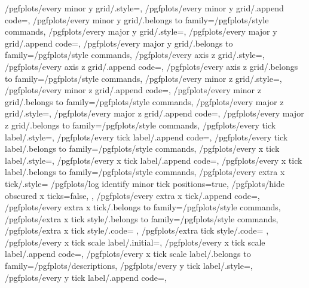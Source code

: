 {	/pgfplots/every minor y grid/.style={},
	/pgfplots/every minor y grid/.append code={},
	/pgfplots/every minor y grid/.belongs to family=/pgfplots/style commands,
	/pgfplots/every major y grid/.style={},
	/pgfplots/every major y grid/.append code={},
	/pgfplots/every major y grid/.belongs to family=/pgfplots/style commands,
	/pgfplots/every axis z grid/.style={},
	/pgfplots/every axis z grid/.append code={},
	/pgfplots/every axis z grid/.belongs to family=/pgfplots/style commands,
	/pgfplots/every minor z grid/.style={},
	/pgfplots/every minor z grid/.append code={},
	/pgfplots/every minor z grid/.belongs to family=/pgfplots/style commands,
	/pgfplots/every major z grid/.style={},
	/pgfplots/every major z grid/.append code={},
	/pgfplots/every major z grid/.belongs to family=/pgfplots/style commands,
	/pgfplots/every tick label/.style={},
	/pgfplots/every tick label/.append code={},
	/pgfplots/every tick label/.belongs to family=/pgfplots/style commands,
	/pgfplots/every x tick label/.style={},
	/pgfplots/every x tick label/.append code={},
	/pgfplots/every x tick label/.belongs to family=/pgfplots/style commands,
	/pgfplots/every extra x tick/.style={
		/pgfplots/log identify minor tick positions=true,
		/pgfplots/hide obscured x ticks=false,
	},
	/pgfplots/every extra x tick/.append code={},
	/pgfplots/every extra x tick/.belongs to family=/pgfplots/style commands,
	/pgfplots/extra x tick style/.belongs to family=/pgfplots/style commands,
	/pgfplots/extra x tick style/.code={%
	},
	/pgfplots/extra tick style/.code={%
	},
	/pgfplots/every x tick scale label/.initial=,%
	/pgfplots/every x tick scale label/.append code={},
	/pgfplots/every x tick scale label/.belongs to family=/pgfplots/descriptions,
	/pgfplots/every y tick label/.style={},
	/pgfplots/every y tick label/.append code={},
}
